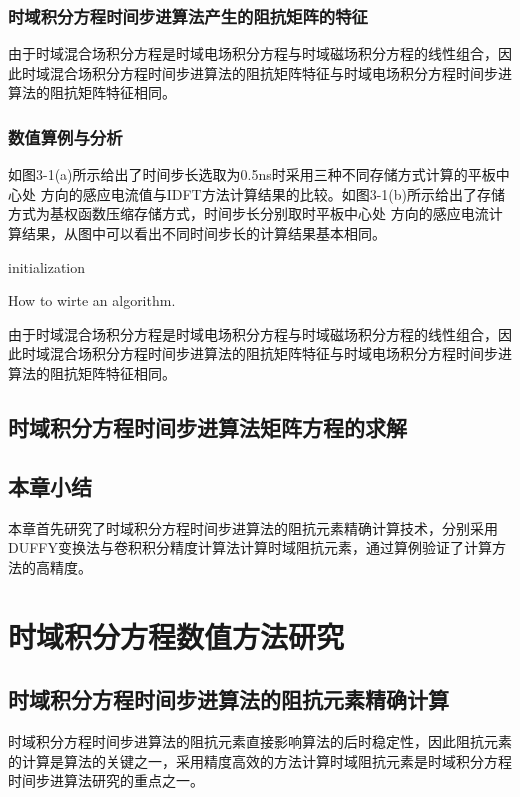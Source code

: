 \documentclass[bachelor]{thesis-uestc}
\begin{document}
\subsection{时域积分方程时间步进算法产生的阻抗矩阵的特征}
由于时域混合场积分方程是时域电场积分方程与时域磁场积分方程的线性组合，因此时域混合场积分方程时间步进算法的阻抗矩阵特征与时域电场积分方程时间步进算法的阻抗矩阵特征相同。

\subsection{数值算例与分析}

如图3-1(a)所示给出了时间步长选取为0.5ns时采用三种不同存储方式计算的平板中心处 方向的感应电流值与IDFT方法计算结果的比较。如图3-1(b)所示给出了存储方式为基权函数压缩存储方式，时间步长分别取时平板中心处 方向的感应电流计算结果，从图中可以看出不同时间步长的计算结果基本相同。

\begin{algorithm}[H]
    initialization\;
    \caption{How to wirte an algorithm.}
\end{algorithm}

由于时域混合场积分方程是时域电场积分方程与时域磁场积分方程的线性组合，因此时域混合场积分方程时间步进算法的阻抗矩阵特征与时域电场积分方程时间步进算法的阻抗矩阵特征相同。

\section{时域积分方程时间步进算法矩阵方程的求解}

\section{本章小结}
本章首先研究了时域积分方程时间步进算法的阻抗元素精确计算技术，分别采用DUFFY变换法与卷积积分精度计算法计算时域阻抗元素，通过算例验证了计算方法的高精度。

\chapter{时域积分方程数值方法研究}
\section{时域积分方程时间步进算法的阻抗元素精确计算}
时域积分方程时间步进算法的阻抗元素直接影响算法的后时稳定性，因此阻抗元素的计算是算法的关键之一，采用精度高效的方法计算时域阻抗元素是时域积分方程时间步进算法研究的重点之一。
\end{document}
